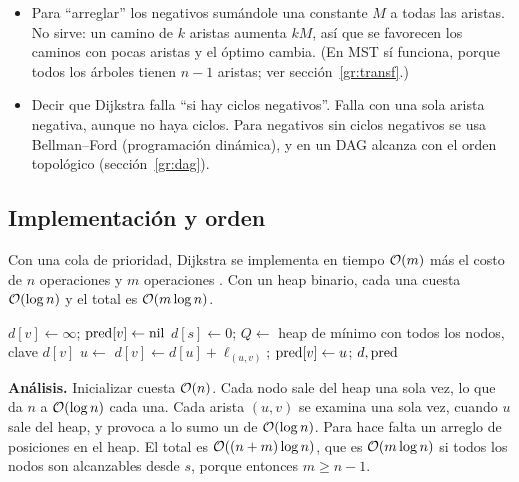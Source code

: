 \begin{trampa}
\begin{itemize}
  \item Para ``arreglar'' los negativos sumándole una constante $M$ a todas las aristas. No sirve: un camino de $k$ aristas aumenta $kM$, así que se favorecen los caminos con pocas aristas y el óptimo cambia. (En MST sí funciona, porque todos los árboles tienen $n-1$ aristas; ver sección~\ref{gr:transf}.)
  \item Decir que Dijkstra falla ``si hay ciclos negativos''. Falla con una sola arista negativa, aunque no haya ciclos. Para negativos sin ciclos negativos se usa Bellman–Ford (programación dinámica), y en un DAG alcanza con el orden topológico (sección~\ref{gr:dag}).
\end{itemize}
\end{trampa}

\subsection{Implementación y orden}

\begin{resultado}[(4.15)]
Con una cola de prioridad, Dijkstra se implementa en tiempo $\mathcal{O}(m)$ más el costo de $n$ operaciones  y $m$ operaciones . Con un heap binario, cada una cuesta $\mathcal{O}(\log n)$ y el total es $\mathcal{O}(m\log n)$.
\end{resultado}

\begin{algorithmic}[1]
 
   \State $d[v]\gets\infty$; $\mathrm{pred}[v]\gets\mathrm{nil}$ \EndFor
  \State $d[s]\gets 0$; $Q\gets$ heap de mínimo con todos los nodos, clave $d[v]$
    \State $u\gets$  
        \State $d[v]\gets d[u]+\ell_{(u,v)}$; $\mathrm{pred}[v]\gets u$; 
      \EndIf
    \EndFor
  \EndWhile
  \State \Return $d,\mathrm{pred}$
\EndFunction
\end{algorithmic}

\textbf{Análisis.} Inicializar cuesta $\mathcal{O}(n)$. Cada nodo sale del heap una sola vez, lo que da $n$  a $\mathcal{O}(\log n)$ cada una. Cada arista $(u,v)$ se examina una sola vez, cuando $u$ sale del heap, y provoca a lo sumo un  de $\mathcal{O}(\log n)$. Para  hace falta un arreglo de posiciones en el heap. El total es $\mathcal{O}((n+m)\log n)$, que es $\mathcal{O}(m\log n)$ si todos los nodos son alcanzables desde $s$, porque entonces $m\ge n-1$.

